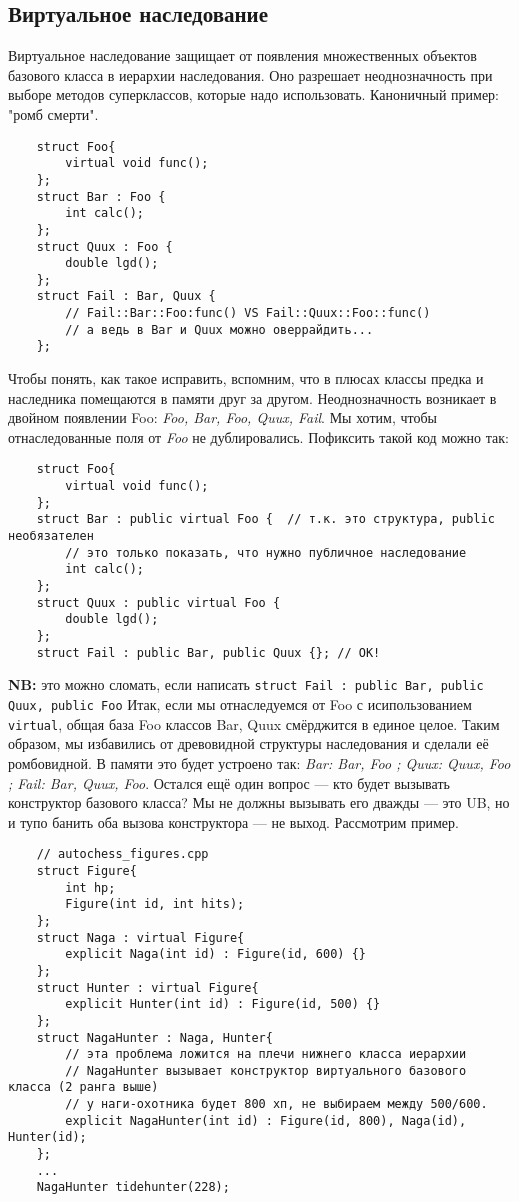 \documentclass[15pt, a4paper]{article}
\newcommand{\nl}{\newline}
\begin{document}
\subsection{Виртуальное наследование}
Виртуальное наследование защищает от появления множественных объектов базового класса в иерархии наследования.
Оно разрешает неоднозначность при выборе методов суперклассов, которые надо использовать. Каноничный пример: "ромб смерти".
\begin{verbatim}
    struct Foo{
        virtual void func();
    };
    struct Bar : Foo {
        int calc();
    };
    struct Quux : Foo {
        double lgd();
    };
    struct Fail : Bar, Quux {
        // Fail::Bar::Foo:func() VS Fail::Quux::Foo::func()
        // а ведь в Bar и Quux можно оверрайдить...
    };
\end{verbatim}
Чтобы понять, как такое исправить, вспомним, что в плюсах классы предка и наследника помещаются в памяти друг за другом. Неоднозначность возникает в двойном появлении Foo:
\textit{Foo, Bar, Foo, Quux, Fail}. Мы хотим, чтобы отнаследованные поля от \textit{Foo} не дублировались.
Пофиксить такой код можно так:
\begin{verbatim}
    struct Foo{
        virtual void func();
    };
    struct Bar : public virtual Foo {  // т.к. это структура, public необязателен
        // это только показать, что нужно публичное наследование
        int calc();
    };
    struct Quux : public virtual Foo {
        double lgd();
    };
    struct Fail : public Bar, public Quux {}; // OK!
\end{verbatim}
\textbf{NB:} это можно сломать, если написать \texttt{struct Fail : public Bar, public Quux, public Foo} \nl
Итак, если мы отнаследуемся от Foo с исипользованием \texttt{virtual}, общая база Foo классов Bar, Quux смёрджится в единое целое. Таким образом, мы избавились от древовидной структуры наследования
и сделали её ромбовидной. \nl
В памяти это будет устроено так: \textit{Bar: Bar, Foo ; Quux: Quux, Foo ; Fail: Bar, Quux, Foo}. \nl
Остался ещё один вопрос --- кто будет вызывать конструктор базового класса? Мы не должны вызывать его дважды --- это UB, но и тупо банить оба вызова конструктора --- не выход. Рассмотрим пример.\newpage
\begin{verbatim}
    // autochess_figures.cpp
    struct Figure{
        int hp;
        Figure(int id, int hits);
    }; 
    struct Naga : virtual Figure{
        explicit Naga(int id) : Figure(id, 600) {}
    };
    struct Hunter : virtual Figure{
        explicit Hunter(int id) : Figure(id, 500) {}
    };
    struct NagaHunter : Naga, Hunter{
        // эта проблема ложится на плечи нижнего класса иерархии
        // NagaHunter вызывает конструктор виртуального базового класса (2 ранга выше)
        // у наги-охотника будет 800 хп, не выбираем между 500/600.
        explicit NagaHunter(int id) : Figure(id, 800), Naga(id), Hunter(id);
    };
    ...
    NagaHunter tidehunter(228);
\end{verbatim}
\end{document}
